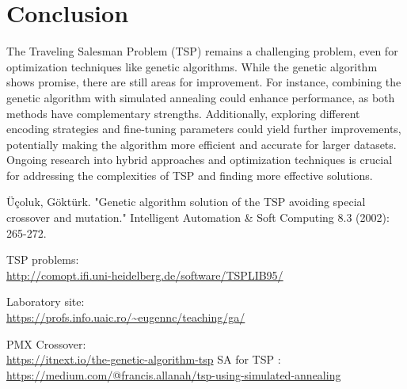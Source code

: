 \documentclass{article}
\begin{document}
\section{Conclusion}

The Traveling Salesman Problem (TSP) remains a challenging problem, even for optimization techniques like genetic algorithms. While the genetic algorithm shows promise, there are still areas for improvement. For instance, combining the genetic algorithm with simulated annealing could enhance performance, as both methods have complementary strengths. Additionally, exploring different encoding strategies and fine-tuning parameters could yield further improvements, potentially making the algorithm more efficient and accurate for larger datasets. Ongoing research into hybrid approaches and optimization techniques is crucial for addressing the complexities of TSP and finding more effective solutions.



\begin{thebibliography}{9}


Üçoluk, Göktürk. "Genetic algorithm solution of the TSP avoiding special crossover and mutation." Intelligent Automation \& Soft Computing 8.3 (2002): 265-272.

TSP problems:\\
\url{http://comopt.ifi.uni-heidelberg.de/software/TSPLIB95/}

\bibitem{}
Laboratory site: \\
\url{https://profs.info.uaic.ro/~eugennc/teaching/ga/}


PMX Crossover:\\ \href{https://itnext.io/the-genetic-algorithm-and-the-travelling-salesman-problem-tsp-31dfa57f3b62}
{https://itnext.io/the-genetic-algorithm-tsp}
\url{}
SA for TSP : \\ \href{https://medium.com/@francis.allanah/travelling-salesman-problem-using-simulated-annealing-f547a71ab3c6}
{https://medium.com/@francis.allanah/tsp-using-simulated-annealing}

\end{thebibliography} 
\end{document}
